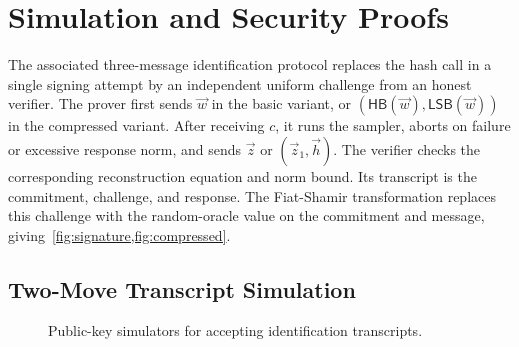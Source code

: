 \section{Simulation and Security Proofs}
\label{app:security}

\begin{definition}
\label{def:identification}
The associated three-message identification protocol replaces the hash call in a single signing attempt by an independent uniform challenge from an honest verifier. The prover first sends $\vec w$ in the basic variant, or $(\mathsf{HB}(\vec w),\mathsf{LSB}(\vec w))$ in the compressed variant. After receiving $c$, it runs the sampler, aborts on failure or excessive response norm, and sends $\vec z$ or $(\vec z_1,\vec h)$. The verifier checks the corresponding reconstruction equation and norm bound. Its transcript is the commitment, challenge, and response. The Fiat-Shamir transformation replaces this challenge with the random-oracle value on the commitment and message, giving~\cref{fig:signature,fig:compressed}.
\end{definition}

\subsection{Two-Move Transcript Simulation}

\begin{figure}[t]
\centering
\begin{minipage}[t]{.44\linewidth}
\centering
{}
\end{minipage}\hfill
\begin{minipage}[t]{.54\linewidth}
\centering
{}
\end{minipage}
\caption{Public-key simulators for accepting identification transcripts.}
\label{fig:simulator}
\end{figure}

